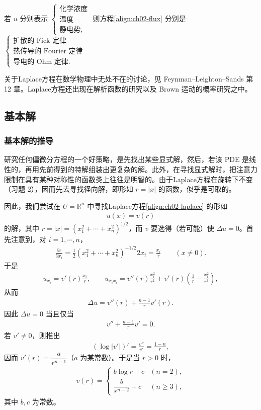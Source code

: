 \documentclass[../../main.tex]{subfiles}
\begin{document}
若 $u$ 分别表示
$\begin{cases}\text{化学浓度}\\ \text{温度}\\ \text{静电势},\end{cases}$
则方程\eqref{align:ch02-flux} 分别是
$\begin{cases}\text{扩散的 Fick 定律}\\ \text{热传导的 Fourier 定律}\\ \text{导电的 Ohm 定律}.\end{cases}$

关于Laplace方程在数学物理中无处不在的讨论，见 Feynman--Leighton--Sands \cite{F-L-S} 第 12 章。Laplace方程还出现在解析函数的研究以及 Brown 运动的概率研究之中。

\subsection{基本解}\label{subsection:ch02-fundamental}

\subsubsection{基本解的推导}

研究任何偏微分方程的一个好策略，是先找出某些显式解，然后，若该 PDE 是线性的，再用先前得到的特解组装出更复杂的解。此外，在寻找显式解时，把注意力限制在具有某种对称性的函数类上往往是明智的。由于Laplace方程在旋转下不变（习题 2），因而先去寻找径向解，即形如 $r=|x|$ 的函数，似乎是可取的。

因此，我们尝试在 $U=\mathbb{R}^n$ 中寻找Laplace方程\eqref{align:ch02-laplace} 的形如
\begin{align*}
u(x)=v(r)
\end{align*}
的解，其中 $r=|x|=(x_1^2+\cdots+x_n^2)^{1/2}$，而 $v$ 要选得（若可能）使 $\Delta u=0$。首先注意到，对 $i=1,\cdots,n$，
\begin{align*}
\frac{\partial r}{\partial x_i}=\frac{1}{2}(x_1^2+\cdots+x_n^2)^{-1/2}2x_i=\frac{x_i}{r}\qquad (x\neq 0).
\end{align*}
于是
\begin{align*}
u_{x_i}=v'(r)\frac{x_i}{r},\qquad
u_{x_i x_i}=v''(r)\frac{x_i^2}{r^2}+v'(r)\left(\frac{1}{r}-\frac{x_i^2}{r^3}\right),
\end{align*}
从而
\begin{align*}
\Delta u=v''(r)+\frac{n-1}{r}v'(r).
\end{align*}
因此 $\Delta u=0$ 当且仅当
\begin{align}\label{align:ch02-radial-ode}
v''+\frac{n-1}{r}v'=0.
\end{align}
若 $v'\neq 0$，则推出
\begin{align*}
(\log|v'|)'=\frac{v''}{v'}=\frac{1-n}{r},
\end{align*}
因而 $v'(r)=\dfrac{a}{r^{n-1}}$（$a$ 为某常数）。于是当 $r>0$ 时，
\begin{align*}
v(r)=
\begin{cases}
b\log r+c & (n=2),\\
\dfrac{b}{r^{n-2}}+c & (n\geqslant 3),
\end{cases}
\end{align*}
其中 $b,c$ 为常数。
\end{document}
